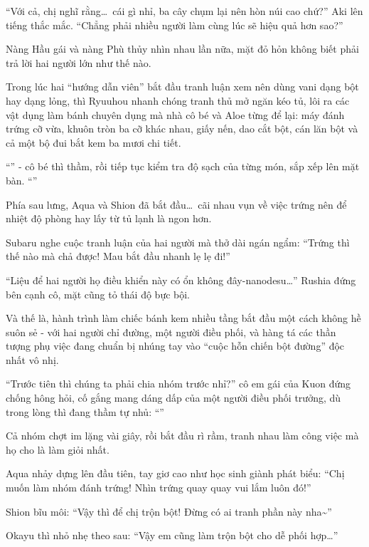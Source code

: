 \documentclass[../main.tex]{subfiles}
\begin{document}
``Với cả, chị nghĩ rằng\dots\ cái gì nhỉ, ba cây chụm lại nên hòn núi cao chứ?'' Aki lên tiếng thắc mắc. ``Chẳng phải nhiều người làm cùng lúc sẽ hiệu quả hơn sao?''

Nàng Hầu gái và nàng Phù thủy nhìn nhau lần nữa, mặt đỏ hỏn không biết phải trả lời hai người lớn như thế nào.

\ct

Trong lúc hai ``hướng dẫn viên'' bắt đầu tranh luận xem nên dùng vani dạng bột hay dạng lỏng, thì Ryuuhou nhanh chóng tranh thủ mở ngăn kéo tủ, lôi ra các vật dụng làm bánh chuyên dụng mà nhà cô bé và Aloe từng để lại: máy đánh trứng cỡ vừa, khuôn tròn ba cỡ khác nhau, giấy nến, dao cắt bột, cán lăn bột và cả một bộ đui bắt kem ba mươi chi tiết.

``'' - cô bé thì thầm, rồi tiếp tục kiểm tra độ sạch của từng món, sắp xếp lên mặt bàn. ``''

Phía sau lưng, Aqua và Shion đã bắt đầu\dots\ cãi nhau vụn về việc trứng nên để nhiệt độ phòng hay lấy từ tủ lạnh là ngon hơn.

Subaru nghe cuộc tranh luận của hai người mà thở dài ngán ngẩm: ``Trứng thì thế nào mà chả được! Mau bắt đầu nhanh lẹ lẹ đi!''

``Liệu để hai người họ điều khiển này có ổn  không đây-nanodesu\dots'' Rushia đứng bên cạnh cô, mặt cũng tỏ thái độ bực bội.

Và thế là, hành trình làm chiếc bánh kem nhiều tầng bắt đầu một cách không hề suôn sẻ - với hai người chỉ đường, một người điều phối, và hàng tá các thần tượng phụ việc đang chuẩn bị nhúng tay vào ``cuộc hỗn chiến bột đường'' độc nhất vô nhị.

``Trước tiên thì chúng ta phải chia nhóm trước nhỉ?'' cô em gái của Kuon đứng chống hông hỏi, cố gắng mang dáng dấp của một người điều phối trưởng, dù trong lòng thì đang thầm tự nhủ: ``\textit{}''

Cả nhóm chợt im lặng vài giây, rồi bắt đầu rì rầm, tranh nhau làm công việc mà họ cho là làm giỏi nhất.

Aqua nhảy dựng lên đầu tiên, tay giơ cao như học sinh giành phát biểu: ``Chị muốn làm nhóm đánh trứng! Nhìn trứng quay quay vui lắm luôn đó!''

Shion bĩu môi: ``Vậy thì để chị trộn bột! Đừng có ai tranh phần này nha\~{}''

Okayu thì nhỏ nhẹ theo sau: ``Vậy em cũng làm trộn bột cho dễ phối hợp\dots''
\end{document}
